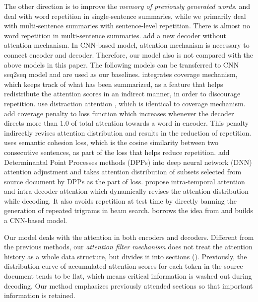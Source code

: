 The other direction is to improve the 
{\em memory of previously generated words}.
\cite{SuzukiN17} and \cite{LinSMS18} 
deal with word repetition in single-sentence summaries, 
while we primarily deal with multi-sentence summaries with 
sentence-level repetition. 
There is almost no word repetition in multi-sentence summaries.
\cite{JiangB18} add a new decoder without attention mechanism.
In CNN-based model, attention mechanism is necessary to connect encoder 
and decoder.
Therefore, our model also is not compared with the above models in this paper. 
The following models can be transferred to CNN seq2seq model and
are used as our baselines.
\cite{SeeLM17} integrates coverage mechanism, 
which keeps track of what has been summarized, as a feature that helps 
redistribute the attention scores in an indirect manner,
in order to discourage repetition. 
\cite{TanWX17} use distraction attention
\citep{ChenZLWJ16}, which is identical to coverage mechanism. 
\cite{GehrmannDR18} add coverage penalty to loss function
which increases whenever the decoder directs more than 1.0 of total attention
towards a word in encoder.
This penalty indirectly revises attention distribution and results in
the reduction of repetition.
\cite{elikyilmazBHC18} uses semantic cohesion loss,
which is the cosine similarity between two consecutive sentences, as part of
the loss that helps reduce repetition.
\cite{DivC2C19} add Determinantal Point Processes methods (DPPs)
into deep neural network (DNN) attention adjustment
and takes attention distribution of
subsets selected from source document by DPPs as the part of loss.
\cite{PaulusXS17} propose intra-temporal attention \citep{NallapatiZSGX16} and 
intra-decoder attention which dynamically revises the attention distribution while decoding. 
It also avoids repetition at test time by directly banning the generation of 
repeated trigrams in beam search. 
\cite{FanGA18} borrows the idea from \cite{PaulusXS17} and 
builds a CNN-based model. 

Our model deals with the attention in both encoders and decoders. 
Different from the previous methods, 
our \textit{attention filter mechanism} does not 
treat the attention history as a whole data structure,  
but divides it into sections (). 
Previously, the distribution curve of accumulated attention scores 
for each token in the source document tends to be flat, 
which means critical information is washed out during decoding.
Our method emphasizes previously attended sections 
so that important information is retained.

